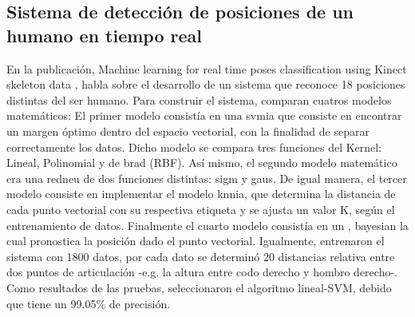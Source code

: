 \subsection{Sistema de detecci\'on de posiciones de un humano en tiempo real} \label{tr:8} 
En la publicaci\'on, Machine learning for real time poses classification using Kinect skeleton data \cite{choubik2016machine}, habla sobre el desarrollo de un sistema que reconoce 18 posiciones distintas del ser humano.
\medbreak 
Para construir el sistema,   comparan cuatros modelos matem\'aticos: El primer modelo consist\'ia en una \gls{svmia} que consiste en encontrar un margen \'optimo dentro del espacio vectorial, con la finalidad de separar correctamente los datos. Dicho modelo se compara tres funciones del Kernel: Lineal, Polinomial y de \gls{brad} (RBF). As\'i mismo, el segundo modelo matem\'atico era una \gls{redneu} de dos funciones distintas: \gls{sigm}  y \gls{gaus}. De igual manera, el tercer modelo consiste en implementar el modelo \gls{knnia}, que determina la distancia de cada punto vectorial con su respectiva etiqueta y se ajusta un valor K, seg\'un el entrenamiento de datos. Finalmente el cuarto modelo consist\'ia en un , \gls{bayesian} la cual pronostica la posici\'on dado el punto vectorial.
\medbreak 
Igualmente,  entrenaron el sistema con 1800 datos, por cada dato se determin\'o  20 distancias relativa entre dos puntos de articulaci\'on -e.g. la altura entre codo derecho y hombro derecho-.
\medbreak 
Como resultados de las pruebas,   seleccionaron el algoritmo lineal-SVM, debido que tiene un 99.05\% de precisi\'on.
